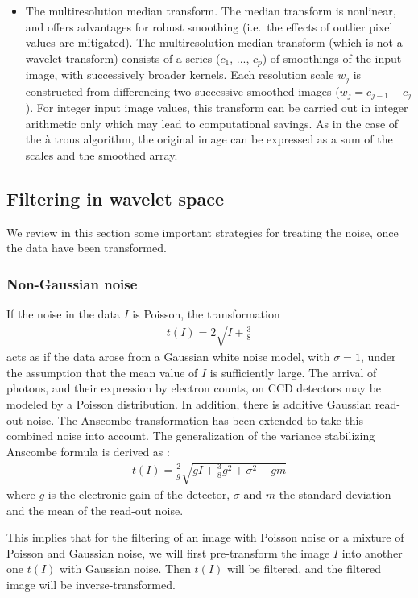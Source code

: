 \begin{itemize}
\item The multiresolution median transform.
The median transform is nonlinear, and offers advantages for robust 
smoothing (i.e.\ the effects of outlier pixel values are mitigated).
The multiresolution median transform \cite{starck:sta96_2} (which is not 
a wavelet transform) consists of a series ($c_1$, ..., $c_p$) of smoothings of
the input image, with successively broader kernels. Each resolution scale $w_j$
is constructed from differencing two successive smoothed images 
($w_j = c_{j-1} - c_j$).
For integer input image values, this transform can be carried out in 
integer arithmetic only which may lead to computational savings.
As in the case of the \`a trous algorithm, the original image can be 
expressed as a sum of the scales and the smoothed array.
\end{itemize}


\subsection{Filtering in wavelet space}
We review in this section some important strategies for treating the 
noise, once the data have been transformed.

\subsubsection*{Non-Gaussian noise}
If the noise in the data $I$ is Poisson, the transformation 
\cite{rest:anscombe48}
\begin{eqnarray}
t(I) = 2\sqrt{I + \frac{3}{8}}
\end{eqnarray}
acts as if the data arose from a
Gaussian white noise model, with $\sigma = 1$, under the
assumption that the mean value of $I$ is sufficiently large.
The arrival of photons, and their expression by electron counts, on CCD
detectors may be modeled by a Poisson distribution.  In addition, there is 
additive Gaussian read-out noise. The Anscombe 
transformation has been extended to take this combined noise into 
account.  The  generalization of the variance stabilizing
Anscombe formula is derived as \cite{starck:mur95_2}:
\begin{eqnarray}
t(I) = \frac{2}{g} \sqrt{g I + \frac{3}{8} g^2 + \sigma^2 - g m}
\label{eqn_bijaoui}
\end{eqnarray}
where $g$ is the electronic gain of the detector, $\sigma$ and $m$ the standard deviation 
and the mean of the read-out noise. 
 
This implies that for the filtering of an image with Poisson noise or
a mixture of Poisson and Gaussian noise, we will first pre-transform 
the image $I$ into another one $t(I)$ with Gaussian noise. Then $t(I)$ 
will be filtered, and the filtered image will be inverse-transformed.

